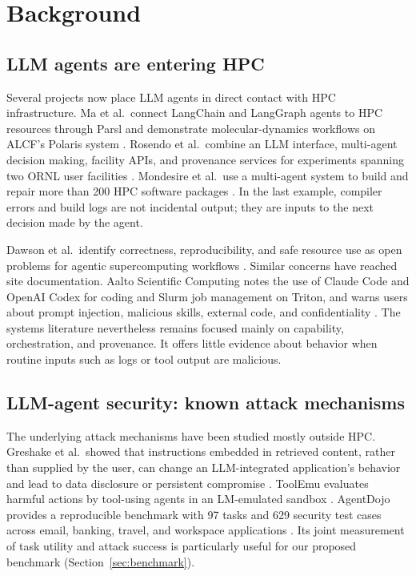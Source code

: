 \section{Background}
\label{sec:background}

\subsection{LLM agents are entering HPC}
\label{sec:background-hpc}

Several projects now place LLM agents in direct contact with HPC infrastructure. Ma et al.\ connect LangChain and LangGraph agents to HPC resources through Parsl and demonstrate molecular-dynamics workflows on ALCF's Polaris system \cite{Ma2025HPCAgent}. Rosendo et al.\ combine an LLM interface, multi-agent decision making, facility APIs, and provenance services for experiments spanning two ORNL user facilities \cite{Rosendo2025ORNL}. Mondesire et al.\ use a multi-agent system to build and repair more than 200 HPC software packages \cite{Mondesire2025PEARC}. In the last example, compiler errors and build logs are not incidental output; they are inputs to the next decision made by the agent.

Dawson et al.\ identify correctness, reproducibility, and safe resource use as open problems for agentic supercomputing workflows \cite{Dawson2026LARA}. Similar concerns have reached site documentation. Aalto Scientific Computing notes the use of Claude Code and OpenAI Codex for coding and Slurm job management on Triton, and warns users about prompt injection, malicious skills, external code, and confidentiality \cite{AaltoSciComp2026}. The systems literature nevertheless remains focused mainly on capability, orchestration, and provenance. It offers little evidence about behavior when routine inputs such as logs or tool output are malicious.

\subsection{LLM-agent security: known attack mechanisms}
\label{sec:background-agent-security}

The underlying attack mechanisms have been studied mostly outside HPC. Greshake et al.\ showed that instructions embedded in retrieved content, rather than supplied by the user, can change an LLM-integrated application's behavior and lead to data disclosure or persistent compromise \cite{Greshake2023PromptInjection}. ToolEmu evaluates harmful actions by tool-using agents in an LM-emulated sandbox \cite{Ruan2024ToolEmu}. AgentDojo provides a reproducible benchmark with 97 tasks and 629 security test cases across email, banking, travel, and workspace applications \cite{Debenedetti2024AgentDojo}. Its joint measurement of task utility and attack success is particularly useful for our proposed benchmark (Section~\ref{sec:benchmark}).

